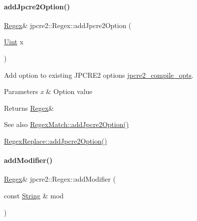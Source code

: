 \paragraph{\texorpdfstring{add\+Jpcre2\+Option()}{addJpcre2Option()}}
{\footnotesize\ttfamily \hyperlink{classjpcre2_1_1Regex}{Regex}\& jpcre2\+::\+Regex\+::add\+Jpcre2\+Option (\begin{DoxyParamCaption}\item[{\hyperlink{namespacejpcre2_a078242d38221a13fb3543b9edd78c099}{Uint}}]{x }\end{DoxyParamCaption})\hspace{0.3cm}{\ttfamily [inline]}}



Add option to existing J\+P\+C\+R\+E2 options \hyperlink{classjpcre2_1_1Regex_abdd26c3bc1c3132f0aa73dde1690a7ef}{jpcre2\+\_\+compile\+\_\+opts}. 


\begin{DoxyParams}{Parameters}
{\em x} & Option value \\
\hline
\end{DoxyParams}
\begin{DoxyReturn}{Returns}
\hyperlink{classjpcre2_1_1Regex}{Regex}\& 
\end{DoxyReturn}
\begin{DoxySeeAlso}{See also}
\hyperlink{classjpcre2_1_1RegexMatch_a0a4cf8554a7e00f3cf2db34f60a43f60_a0a4cf8554a7e00f3cf2db34f60a43f60}{Regex\+Match\+::add\+Jpcre2\+Option()} 

\hyperlink{classjpcre2_1_1RegexReplace_a3f86b1e11d08d0153a08244771e59061_a3f86b1e11d08d0153a08244771e59061}{Regex\+Replace\+::add\+Jpcre2\+Option()} 
\end{DoxySeeAlso}
\hypertarget{classjpcre2_1_1Regex_ab1af1471339602446d8221b8c97c6b55_ab1af1471339602446d8221b8c97c6b55}{}\label{classjpcre2_1_1Regex_ab1af1471339602446d8221b8c97c6b55_ab1af1471339602446d8221b8c97c6b55} 
\paragraph{\texorpdfstring{add\+Modifier()}{addModifier()}}
{\footnotesize\ttfamily \hyperlink{classjpcre2_1_1Regex}{Regex}\& jpcre2\+::\+Regex\+::add\+Modifier (\begin{DoxyParamCaption}\item[{const \hyperlink{namespacejpcre2_a91f03070152fb228bc116c5a737f1d16}{String} \&}]{mod }\end{DoxyParamCaption})\hspace{0.3cm}{\ttfamily [inline]}}



